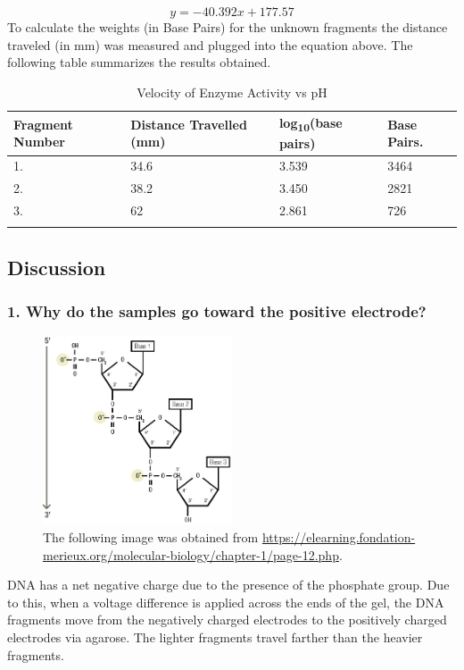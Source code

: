 \documentclass[pdflatex,sn-mathphys]{sn-jnl}%
\theoremstyle{thmstyleone}%
\theoremstyle{thmstyletwo}%
\theoremstyle{thmstylethree}%
\begin{document}
\[y = -40.392x + 177.57\]
To calculate the weights (in Base Pairs) for the unknown fragments the distance traveled (in mm) was measured and plugged into the equation above. The following table summarizes the results obtained.
\begin{table}[h]
  \begin{center}
  \begin{minipage}{200pt}
  \caption{Velocity of Enzyme Activity vs pH}\label{tab1}
  \begin{tabular}{  m{5em}  m{5em} m{5em}  m{5em}} 
    \toprule
   Fragment Number & Distance Travelled (mm) & log\textsubscript{10}(base pairs) & Base Pairs.\footnotemark[1]\\
    \midrule
1. & 34.6 & 3.539 & 3464\\
2. & 38.2 & 3.450 & 2821\\
3. & 62 & 2.861 & 726\\
    \botrule
  \end{tabular}
  \end{minipage}
  \end{center}
  \end{table}
\subsection*{Discussion}
\subsubsection*{1. Why do the samples go toward the positive electrode?}
\begin{figure}[hp]
\centering
\includegraphics[width=0.5\textwidth]{photos/negative_charge_on_dna.png}
\caption{The following image was obtained from \href{https://elearning.fondation-merieux.org/molecular-biology/chapter-1/page-12.php}{https://elearning.fondation-merieux.org/molecular-biology/chapter-1/page-12.php}.}\label{fig1}
\end{figure}
DNA has a net negative charge due to the presence of the phosphate group. Due to this, when a voltage difference is applied across the ends of the gel, the DNA fragments move from the negatively charged electrodes to the positively charged electrodes via agarose. The lighter fragments travel farther than the heavier fragments.
\end{document}
